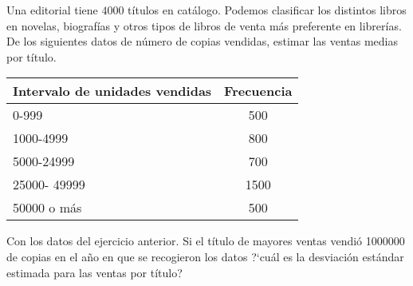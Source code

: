 \documentclass[12pt]{article}
\begin{document}
\begin{prob}
Una editorial tiene $4000$ títulos en catálogo. Podemos clasificar los distintos libros
en novelas, biografías  y otros tipos de libros de venta más preferente en librerías. De
los siguientes datos de número de copias vendidas, estimar las ventas medias por título.

\begin{center}
\begin{tabular}{l|c}
{\parbox{2cm} {Intervalo de unidades vendidas}} & Frecuencia \\ \hline 0-999 & 500 \\
1000-4999 & 800 \\ 5000-24999 & 700 \\ 25000- 49999 & 1500 \\ 50000 o más & 500\\
\hline
\end{tabular}
\end{center}
\end{prob}

\begin{prob}
Con los datos del ejercicio anterior. Si el título de mayores ventas
 vendió 1000000 de copias en el año en que se recogieron los
datos ?`cuál es la desviación estándar estimada para las ventas por título?
\end{prob}
\end{document}
